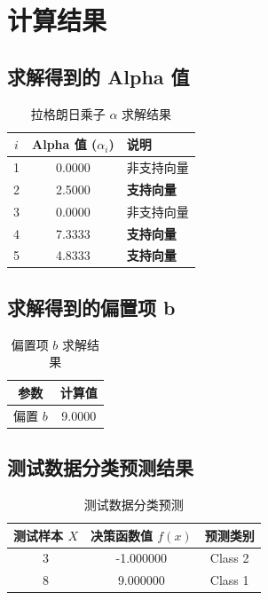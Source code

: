\documentclass[11pt, a4paper]{article}
\begin{document}
	\section{计算结果}
	
	\subsection{求解得到的 Alpha 值}
	\begin{table}[htbp]
		\centering
		\caption{拉格朗日乘子 $\alpha$ 求解结果}
		\begin{tabular}{ccl}
			\toprule
			$i$ & Alpha 值 ($\alpha_i$) & 说明 \\
			\midrule
			1 & 0.0000 & 非支持向量 \\
			2 & 2.5000 & \textbf{支持向量} \\
			3 & 0.0000 & 非支持向量 \\
			4 & 7.3333 & \textbf{支持向量} \\
			5 & 4.8333 & \textbf{支持向量} \\
			\bottomrule
		\end{tabular}
	\end{table}
	
	\subsection{求解得到的偏置项 b}
	\begin{table}[htbp]
		\centering
		\caption{偏置项 $b$ 求解结果}
		\begin{tabular}{cc}
			\toprule
			参数 & 计算值 \\
			\midrule
			偏置 $b$ & 9.0000 \\
			\bottomrule
		\end{tabular}
	\end{table}
	
	\subsection{测试数据分类预测结果}
	\begin{table}[htbp]
		\centering
		\caption{测试数据分类预测}
		\begin{tabular}{ccc}
			\toprule
			测试样本 $X$ & 决策函数值 $f(x)$ & 预测类别 \\
			\midrule
			3 & -1.000000 & Class 2 \\
			8 & 9.000000 & Class 1 \\
			\bottomrule
		\end{tabular}
	\end{table}
	
\end{document}
